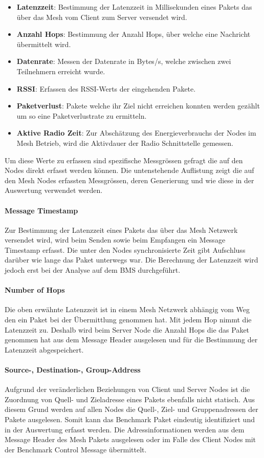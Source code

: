 \begin{itemize}
	\item \textbf{Latenzzeit}: Bestimmung der Latenzzeit in Millisekunden eines Pakets das über das Mesh vom Client zum Server versendet wird.  
	\item \textbf{Anzahl Hops}: Bestimmung der Anzahl Hops, über welche eine Nachricht übermittelt wird.
	\item \textbf{Datenrate}: Messen der Datenrate in Bytes/s, welche zwischen zwei Teilnehmern erreicht wurde. 
	\item \textbf{RSSI}: Erfassen des RSSI-Werts der eingehenden Pakete.
	\item \textbf{Paketverlust}: Pakete welche ihr Ziel nicht erreichen konnten werden gezählt um so eine Paketverlustrate zu ermitteln.
	\item \textbf{Aktive Radio Zeit}: Zur Abschätzung des Energieverbrauchs der Nodes im Mesh Betrieb, wird die Aktivdauer der Radio Schnittstelle gemessen.
\end{itemize}


Um diese Werte zu erfassen sind spezifische Messgrössen gefragt die auf den Nodes direkt erfasst werden können.
Die untenstehende Auflistung zeigt die auf den Mesh Nodes erfassten Messgrössen, deren Generierung und wie diese in der Auswertung verwendet werden.


\paragraph{Message Timestamp}
Zur Bestimmung der Latenzzeit eines Pakets das über das Mesh Netzwerk versendet wird, wird beim Senden sowie beim Empfangen ein Message Timestamp erfasst.
Die unter den Nodes synchronisierte Zeit gibt Aufschluss darüber wie lange das Paket unterwegs war. Die Berechnung der Latenzzeit wird jedoch erst bei der Analyse auf dem BMS durchgeführt.

\paragraph{Number of Hops}
Die oben erwähnte Latenzzeit ist in einem Mesh Netzwerk abhängig vom Weg den ein Paket bei der Übermittlung genommen hat. Mit jedem Hop nimmt die Latenzzeit zu.
Deshalb wird beim Server Node die Anzahl Hops die das Paket genommen hat aus dem Message Header ausgelesen und für die Bestimmung der Latenzzeit abgespeichert.

\paragraph{Source-, Destination-, Group-Address}
Aufgrund der veränderlichen Beziehungen von Client und Server Nodes ist die Zuordnung von Quell- und Zieladresse eines Pakets ebenfalls nicht statisch. Aus diesem Grund werden auf allen Nodes die Quell-, Ziel- und Gruppenadressen der Pakete ausgelesen. 
Somit kann das Benchmark Paket eindeutig identifiziert und in der Auswertung erfasst werden.
Die Adressinformationen werden aus dem Message Header des Mesh Pakets ausgelesen oder im Falle des Client Nodes mit der Benchmark Control Message übermittelt.

